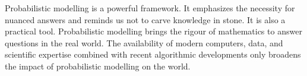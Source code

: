Probabilistic modelling is a powerful framework. It emphasizes the necessity for nuanced answers and reminds us not to carve knowledge in stone. It is also a practical tool. Probabilistic modelling brings the rigour of mathematics to answer questions in the real world. The availability of modern computers, data, and scientific expertise combined with recent algorithmic developments only broadens the impact of probabilistic modelling on the world.



%
%
%
%
%
%
%
%
%

